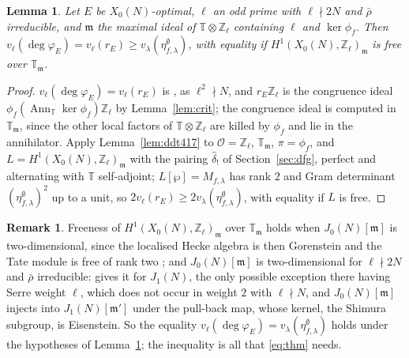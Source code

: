 \documentclass[11pt]{amsart}
\newtheorem{lemma}[theorem]{Lemma}
\theoremstyle{definition}
\newtheorem{remark}[theorem]{Remark}
\newcommand{\Z}{\mathbb{Z}}
\newcommand{\T}{\mathbb{T}}
\newcommand{\degphi}{\deg\varphi_E}
\begin{document}
\begin{lemma}\label{lem:hecke}
Let $E$ be $X_0(N)$-optimal, $\ell$ an odd prime with $\ell\nmid 2N$ and $\bar\rho$ irreducible, and $\mathfrak m$ the maximal ideal of $\T\otimes\Z_\ell$ containing $\ell$ and $\ker\phi_f$. Then $v_\ell(\degphi)=v_\ell(r_E)\ge v_\lambda(\eta^\emptyset_{f,\lambda})$, with equality if $H^1(X_0(N),\Z_\ell)_{\mathfrak m}$ is free over $\T_{\mathfrak m}$.
\end{lemma}
\begin{proof}
$v_\ell(\degphi)=v_\ell(r_E)$ is \cite[Theorem 2.2]{ARS12}, as $\ell^2\nmid N$, and $r_E\Z_\ell$ is the congruence ideal $\phi_f(\operatorname{Ann}_\T\ker\phi_f)\Z_\ell$ by Lemma~\ref{lem:crit}; the congruence ideal is computed in $\T_{\mathfrak m}$, since the other local factors of $\T\otimes\Z_\ell$ are killed by $\phi_f$ and lie in the annihilator. Apply Lemma~\ref{lem:ddt417} to $\mathcal{O}=\Z_\ell$, $\T_{\mathfrak m}$, $\pi=\phi_f$, and $L=H^1(X_0(N),\Z_\ell)_{\mathfrak m}$ with the pairing $\hat\delta_!$ of Section~\ref{sec:dfg}, perfect and alternating with $\T$ self-adjoint; $L[\wp]=M_{f,\lambda}$ has rank $2$ and Gram determinant $(\eta^\emptyset_{f,\lambda})^2$ up to a unit, so $2v_\ell(r_E)\ge2v_\lambda(\eta^\emptyset_{f,\lambda})$, with equality if $L$ is free.
\end{proof}

\begin{remark}\label{rem:free}
Freeness of $H^1(X_0(N),\Z_\ell)_{\mathfrak m}$ over $\T_{\mathfrak m}$ holds when $J_0(N)[\mathfrak m]$ is two-dimensional, since the localised Hecke algebra is then Gorenstein and the Tate module is free of rank two \cite{Tilouine97}; and $J_0(N)[\mathfrak m]$ is two-dimensional for $\ell\nmid2N$ and $\bar\rho$ irreducible: \cite[Theorem 3.5]{RibetStein} gives it for $J_1(N)$, the only possible exception there having Serre weight $\ell$, which does not occur in weight $2$ with $\ell\nmid N$, and $J_0(N)[\mathfrak m]$ injects into $J_1(N)[\mathfrak m']$ under the pull-back map, whose kernel, the Shimura subgroup, is Eisenstein. So the equality $v_\ell(\degphi)=v_\lambda(\eta^\emptyset_{f,\lambda})$ holds under the hypotheses of Lemma~\ref{lem:hecke}; the inequality is all that \eqref{eq:thm} needs.
\end{remark}
\end{document}
